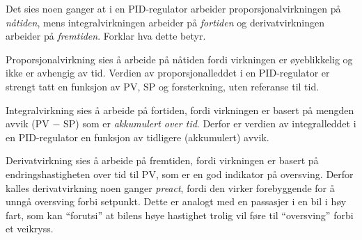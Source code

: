 
Det sies noen ganger at i en PID-regulator arbeider proporsjonalvirkningen på {\it nåtiden}, mens integralvirkningen arbeider på {\it fortiden} og derivatvirkningen arbeider på {\it fremtiden}. Forklar hva dette betyr.







Proporsjonalvirkning sies å arbeide på nåtiden fordi virkningen er øyeblikkelig og ikke er avhengig av tid. Verdien av proporsjonalleddet i en PID-regulator er strengt tatt en funksjon av PV, SP og forsterkning, uten referanse til tid.
 
Integralvirkning sies å arbeide på fortiden, fordi virkningen er basert på mengden avvik (PV $-$ SP) som er {\it akkumulert over tid}. Derfor er verdien av integralleddet i en PID-regulator en funksjon av tidligere (akkumulert) avvik.

Derivatvirkning sies å arbeide på fremtiden, fordi virkningen er basert på endringshastigheten over tid til PV, som er en god indikator på oversving. Derfor kalles derivatvirkning noen ganger {\it preact}, fordi den virker forebyggende for å unngå oversving forbi setpunkt. Dette er analogt med en passasjer i en bil i høy fart, som kan ``forutsi'' at bilens høye hastighet trolig vil føre til ``oversving'' forbi et veikryss.









